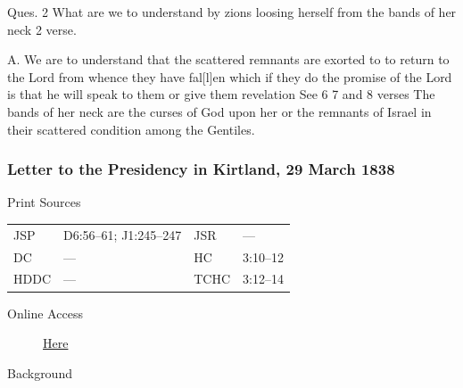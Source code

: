 					Ques. 2 What are we to understand by zions loosing herself from the bands of her neck 2 verse.

					A. We are to understand that the scattered remnants are exorted to to return to the Lord from whence they have fal[l]en which if they do the promise of the Lord is that he will speak to them or give them revelation See 6\supersu{th}\supers{.} 7 and 8 verses The bands of her neck are the curses of God upon her or the remnants of Israel in their scattered condition among the Gentiles.
					
		\subsubsection{Letter to the Presidency in Kirtland, 29 March 1838}
			\label{EMS-1838-JS-29-MAR-1838}
			
			\begin{description}
					\item[Print Sources]
				\end{description}

					\begin{tabular}{p{0.5in}p{1in}p{0.5in}p{1in}}
					JSP	 	& D6:56--61; J1:245--247		& JSR 		& --- \\
					DC	 	& ---		& HC 		& 3:10--12 \\
					HDDC 	& ---		& TCHC 		& 3:12--14 \\
					\end{tabular}
				
				\begin{description}
					\item[Online Access] \href{https://www.josephsmithpapers.org/paper-summary/letter-to-the-presidency-in-kirtland-29-march-1838/1}{Here}
				\end{description}
				
				\begin{description}
					\item[Background]
				\end{description}
				
				
